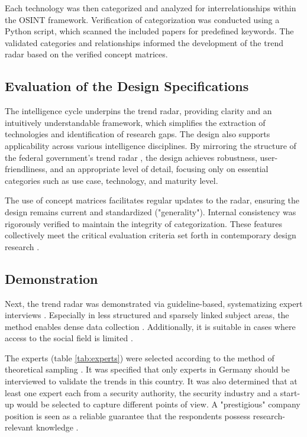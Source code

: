 \documentclass[10pt]{article}
\begin{document}
Each technology was then categorized and analyzed for interrelationships within the OSINT framework. Verification of categorization was conducted using a Python script, which scanned the included papers for predefined keywords. The validated categories and relationships informed the development of the trend radar based on the verified concept matrices.


\subsection{Evaluation of the Design Specifications}

The intelligence cycle underpins the trend radar, providing clarity and an intuitively understandable framework, which simplifies the extraction of technologies and identification of research gaps. The design also supports applicability across various intelligence disciplines. By mirroring the structure of the federal government's trend radar \cite{Stich.2022}, the design achieves robustness, user-friendliness, and an appropriate level of detail, focusing only on essential categories such as use case, technology, and maturity level.

The use of concept matrices facilitates regular updates to the radar, ensuring the design remains current and standardized ("generality"). Internal consistency was rigorously verified to maintain the integrity of categorization. These features collectively meet the critical evaluation criteria set forth in contemporary design research \cite{vomBrocke.2020b}.


\subsection{Demonstration}

Next, the trend radar was demonstrated via guideline-based,
systematizing expert interviews \cite{Bogner.2014, Glaser.2009, Meuser.1991}.
Especially in less structured and sparsely linked subject areas, the method
enables dense data collection \cite{Bogner.2014,Meuser.1991}. Additionally,
it is suitable in cases where access to the social field is limited \cite{Bogner.2002c, Glaser.2009}.

The experts (table \ref{tab:experts}) were selected according to the method of
theoretical sampling \cite{Glaser.1967}. It was specified that only experts in
Germany should be interviewed to validate the trends in this
country. It was also determined that at least one expert each
from a security authority, the security industry and a
start-up would be selected to capture different points of
view. A "prestigious" company position is seen as a reliable
guarantee that the respondents possess research-relevant knowledge \cite{Bogner.2002b}.
\end{document}

